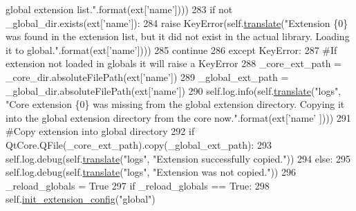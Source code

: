 \begin{DoxyCode}
{       global extension list."}.format(ext[\textcolor{stringliteral}{'name'}])))
283                     \textcolor{keywordflow}{if} \textcolor{keywordflow}{not} \_global\_dir.exists(ext[\textcolor{stringliteral}{'name'}]):
284                         \textcolor{keywordflow}{raise} KeyError(self.\hyperlink{classcommotion__client_1_1utils_1_1extension__manager_1_1ExtensionManager_a2cfd032ca383c3fd6f0f52b99b6dd67c}{translate}(\textcolor{stringliteral}{"Extension \{0\} was found in the extension
       list, but it did not exist in the actual library. Loading it to global."}.format(ext[\textcolor{stringliteral}{'name'}])))
285                     \textcolor{keywordflow}{continue}
286             \textcolor{keywordflow}{except} KeyError:
287                 \textcolor{comment}{#If extension not loaded in globals it will raise a KeyError}
288                 \_core\_ext\_path = \_core\_dir.absoluteFilePath(ext[\textcolor{stringliteral}{'name'}])
289                 \_global\_ext\_path = \_global\_dir.absoluteFilePath(ext[\textcolor{stringliteral}{'name'}])
290                 self.log.info(self.\hyperlink{classcommotion__client_1_1utils_1_1extension__manager_1_1ExtensionManager_a2cfd032ca383c3fd6f0f52b99b6dd67c}{translate}(\textcolor{stringliteral}{"logs"}, \textcolor{stringliteral}{"Core extension \{0\} was missing from the
       global extension directory. Copying it into the global extension directory from the core now."}.format(ext[\textcolor{stringliteral}{'name'}
      ])))
291                 \textcolor{comment}{#Copy extension into global directory}
292                 \textcolor{keywordflow}{if} QtCore.QFile(\_core\_ext\_path).copy(\_global\_ext\_path):
293                     self.log.debug(self.\hyperlink{classcommotion__client_1_1utils_1_1extension__manager_1_1ExtensionManager_a2cfd032ca383c3fd6f0f52b99b6dd67c}{translate}(\textcolor{stringliteral}{"logs"}, \textcolor{stringliteral}{"Extension successfully copied."}))
294                 \textcolor{keywordflow}{else}:
295                     self.log.debug(self.\hyperlink{classcommotion__client_1_1utils_1_1extension__manager_1_1ExtensionManager_a2cfd032ca383c3fd6f0f52b99b6dd67c}{translate}(\textcolor{stringliteral}{"logs"}, \textcolor{stringliteral}{"Extension was not copied."}))
296                 \_reload\_globals = \textcolor{keyword}{True}
297         \textcolor{keywordflow}{if} \_reload\_globals == \textcolor{keyword}{True}:
298             self.\hyperlink{classcommotion__client_1_1utils_1_1extension__manager_1_1ExtensionManager_ae751a1b407e33af012d41ec44f2ce717}{init\_extension\_config}(\textcolor{stringliteral}{"global"})

\end{DoxyCode}
